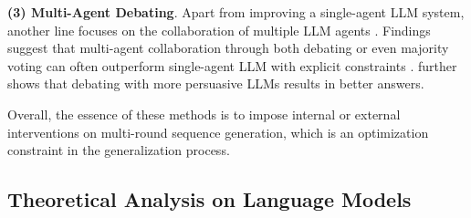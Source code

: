\textbf{(3) Multi-Agent Debating}.
Apart from improving a single-agent LLM system, another line focuses on the collaboration of multiple LLM agents \citep{li2023camel,wei2023multipartychatconversationalagents,hao2023chatllmnetworkbrainsintelligence}. Findings suggest that multi-agent collaboration through both debating or even majority voting can often outperform single-agent LLM with explicit constraints \citep{huang2024large,wu2023autogenenablingnextgenllm}. \citet{pmlr-v235-khan24a} further shows that debating with more persuasive LLMs results in better answers. %

Overall, the essence of these methods is to impose internal or external interventions on multi-round sequence generation, which is an optimization constraint in the generalization process.


\subsection{Theoretical Analysis on Language Models}

